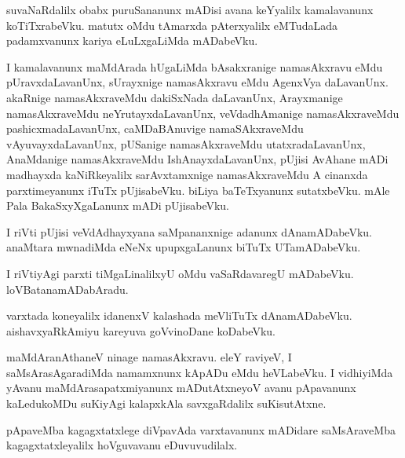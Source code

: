 \documentclass{article}
\begin{document}
\begin{mn}
suvaNaRdalilx  obabx  puruSananunx  mADisi  avana  keYyalilx  kamalavanunx  koTiTxrabeVku.  
matutx  oMdu  tAmarxda  pAterxyalilx  eMTudaLada  padamxvanunx  kariya  eLuLxgaLiMda  mADabeVku.
\end{mn}

\begin{mn}
I  kamalavanunx  maMdArada  hUgaLiMda  bAsakxranige  namasAkxravu  eMdu  pUravxdaLavanUnx,  
sUrayxnige  namasAkxravu  eMdu  AgenxVya daLavanUnx.  akaRnige  namasAkxraveMdu  dakiSxNada  
daLavanUnx,  Arayxmanige  namasAkxraveMdu  neYrutayxdaLavanUnx,  veVdadhAmanige  namasAkxraveMdu  
pashicxmadaLavanUnx,  caMDaBAnuvige  namaSAkxraveMdu  vAyuvayxdaLavanUnx,  pUSanige  namasAkxraveMdu  
utatxradaLavanUnx,  AnaMdanige  namasAkxraveMdu  IshAnayxdaLavanUnx,  pUjisi  AvAhane  mADi  
madhayxda  kaNiRkeyalilx  sarAvxtamxnige  namasAkxraveMdu  A  cinanxda  parxtimeyanunx  iTuTx  
pUjisabeVku.  biLiya  baTeTxyanunx  sutatxbeVku.  mAle  Pala  BakaSxyXgaLanunx  mADi  pUjisabeVku.
\end{mn}

\begin{mn}
I  riVti  pUjisi  veVdAdhayxyana  saMpananxnige  adanunx  dAnamADabeVku.  anaMtara  mwnadiMda  
eNeNx  upupxgaLanunx  biTuTx  UTamADabeVku.
\end{mn}

\begin{mn}
I  riVtiyAgi  parxti  tiMgaLinalilxyU  oMdu  vaSaRdavaregU  mADabeVku.  loVBatanamADabAradu.
\end{mn}

\begin{mn}
varxtada  koneyalilx  idanenxV  kalashada  meVliTuTx  dAnamADabeVku.  aishavxyaRkAmiyu  
kareyuva  goVvinoDane  koDabeVku.
\end{mn}

\begin{mn}
maMdAranAthaneV  ninage  namasAkxravu.  eleY  raviyeV,  I  saMsArasAgaradiMda  namamxnunx  
kApADu  eMdu  heVLabeVku.  I  vidhiyiMda  yAvanu  maMdArasapatxmiyanunx  mADutAtxneyoV  
avanu  pApavanunx  kaLedukoMDu  suKiyAgi  kalapxkAla  savxgaRdalilx  suKisutAtxne.
\end{mn}

\begin{mn}
pApaveMba  kagagxtatxlege  diVpavAda  varxtavanunx  mADidare  saMsAraveMba  
kagagxtatxleyalilx  hoVguvavanu  eDuvuvudilalx. 
\end{mn}
\end{document}
